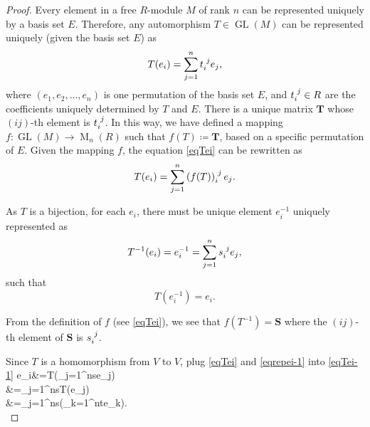 \documentclass[12pt, letterpaper]{article}
\newcommand{\GL}{\operatorname{GL}}
\newcommand{\MM}{\operatorname{M}}
\newcommand{\id}{\indices}
\newcommand{\bfT}{\mathbf{T}}
\newcommand{\bfS}{\mathbf{S}}
\newcommand{\define}{\coloneqq}
\newenvironment{eqlong}{\equation\aligned}{\endaligned\endequation}
\theoremstyle{definition}
\theoremstyle{remark}
\theoremstyle{definition}
\theoremstyle{plain}
\numberwithin{equation}{section}
\begin{document}
	\begin{proof}
		Every element in a free $R$-module $M$ of rank $n$ can be represented uniquely by a basis set $E$.
		Therefore, any automorphism $T \in \GL(M)$ can be represented uniquely (given the basis set $E$) as
		\begin{equation}\label{eqTei}
			T(e_i)=\sum_{j=1}^{n}t\id{_i^j}e_j,
		\end{equation}
		where $(e_1, e_2, \dots, e_n)$ is one permutation of the basis set $E$,
		and $t\id{_i^j}\in R$ are the coefficients uniquely determined by $T$ and $E$.
		There is a unique matrix $\bfT$ whose $(ij)$-th element is $t\id{_i^j}$.
		In this way, we have defined a mapping $f\colon \GL(M)\to \MM_n(R)$
		such that $f(T)\define \bfT$,
		based on a specific permutation of $E$.
		Given the mapping $f$, the equation \eqref{eqTei} can be rewritten as
		\begin{equation}\label{eqTeif}
			T(e_i)=\sum_{j=1}^{n}\left(f(T)\right)\id{_i^j}e_j.
		\end{equation}
		
		As $T$ is a bijection, for each $e_i$, there must be unique element $e_i^{-1}$
		uniquely represented as
		\begin{equation}\label{eqrepei-1}
			T^{-1}(e_i)=e_i^{-1}=\sum_{j=1}^{n}s\id{_i^j}e_j,
		\end{equation}
		such that
		\begin{equation}\label{eqTei-1}
			T(e_i^{-1})=e_i.
		\end{equation}
		
		From the definition of $f$ (see \eqref{eqTei}),
		we see that $f(T^{-1})=\bfS$ where the $(ij)$-th element of $\bfS$ is $s\id{_i^j}$.
		
		Since $T$ is a homomorphism from $V$ to $V$, plug \eqref{eqTei} and \eqref{eqrepei-1} into \eqref{eqTei-1}
		\begin{eqlong}
			e_i&=T\left(\sum_{j=1}^{n}s\id{_i^j}e_j\right)\\
			&=\sum_{j=1}^{n}s\id{_i^j}T(e_j)\\
			&=\sum_{j=1}^{n}s\id{_i^j}\left(\sum_{k=1}^{n}t\id{_j^k}e_k\right).\\
		\end{eqlong}
		

\end{proof}
\end{document}
